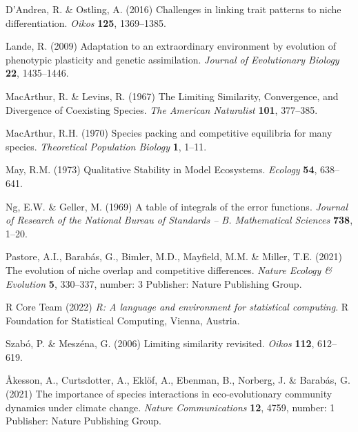 \documentclass[10pt]{article}
\begin{document}
\begin{thebibliography}{18}
D'Andrea, R. \& Ostling, A. (2016) Challenges in linking trait patterns to
  niche differentiation. \emph{Oikos} \textbf{125}, 1369--1385.

Lande, R. (2009) Adaptation to an extraordinary environment by evolution of
  phenotypic plasticity and genetic assimilation. \emph{Journal of Evolutionary
  Biology} \textbf{22}, 1435--1446.

MacArthur, R. \& Levins, R. (1967) The {Limiting} {Similarity}, {Convergence},
  and {Divergence} of {Coexisting} {Species}. \emph{The American Naturalist}
  \textbf{101}, 377--385.

MacArthur, R.H. (1970) Species packing and competitive equilibria for many
  species. \emph{Theoretical Population Biology} \textbf{1}, 1--11.

May, R.M. (1973) Qualitative {Stability} in {Model} {Ecosystems}.
  \emph{Ecology} \textbf{54}, 638--641.

Ng, E.W. \& Geller, M. (1969) A table of integrals of the error functions.
  \emph{{Journal of Research of the National Bureau of Standards -- B.
  Mathematical Sciences}} \textbf{738}, 1--20.

Pastore, A.I., Barabás, G., Bimler, M.D., Mayfield, M.M. \& Miller, T.E.
  (2021) The evolution of niche overlap and competitive differences.
  \emph{Nature Ecology \& Evolution} \textbf{5}, 330--337, number: 3 Publisher:
  Nature Publishing Group.

{R Core Team} (2022) \emph{R: {A} language and environment for statistical
  computing}. R Foundation for Statistical Computing, Vienna, Austria.

Szabó, P. \& Meszéna, G. (2006) Limiting similarity revisited. \emph{Oikos}
  \textbf{112}, 612--619.

Åkesson, A., Curtsdotter, A., Eklöf, A., Ebenman, B., Norberg, J. \&
  Barabás, G. (2021) The importance of species interactions in
  eco-evolutionary community dynamics under climate change. \emph{Nature
  Communications} \textbf{12}, 4759, number: 1 Publisher: Nature Publishing
  Group.

\end{thebibliography}
\end{document}
